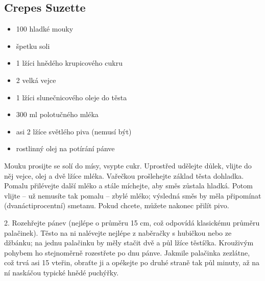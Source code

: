 \documentclass[10pt,a4paper]{article}
\newenvironment{myitemize}
{ \begin{itemize}
    \setlength{\itemsep}{0pt}
    \setlength{\parskip}{0pt}
    \setlength{\parsep}{0pt}     }
{ \end{itemize}                  }
\begin{document}
\subsection{Crepes Suzette}
\begin{minipage}[t]{0,5\textwidth}
\begin{myitemize} 
\item 100 hladké mouky
\item špetku soli
\item 1 lžíci hnědého krupicového cukru
\item 2 velká vejce
\item 1 lžíci slunečnicového oleje do těsta
\item 300 ml polotučného mléka
\item asi 2 lžíce světlého piva (nemusí být)
\item rostlinný olej na potírání pánve

\end{myitemize}
\end{minipage}
\begin{minipage}[t]{0,5\textwidth}
 Mouku prosijte se solí do mísy, vsypte cukr. Uprostřed udělejte důlek, vlijte do něj vejce, olej a dvě lžíce mléka. Vařečkou prošlehejte základ těsta dohladka. Pomalu přilévejte další mléko a stále míchejte, aby směs zůstala hladká. Potom vlijte – už nemusíte tak pomalu – zbylé mléko; výsledná směs by měla připomínat (dvanáctiprocentní) smetanu. Pokud chcete, můžete nakonec přilít pivo.

2. Rozehřejte pánev (nejlépe o průměru 15 cm, což odpovídá klasickému průměru palačinek). Těsto na ni nalévejte nejlépe z naběračky s hubičkou nebo ze džbánku; na jednu palačinku by měly stačit dvě a půl lžíce těstíčka. Krouživým pohybem ho stejnoměrně rozestřete po dnu pánve. Jakmile palačinka zezlátne, což trvá asi 15 vteřin, obraťte ji a opékejte po druhé straně tak půl minuty, až na ní naskáčou typické hnědé puchýřky.
\end{minipage}
\end{document}
